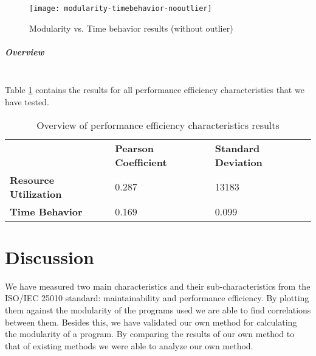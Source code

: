 \documentclass[twoside]{uva-inf-bachelor-thesis}
\newcommand{\myparagraph}[1]{\paragraph{#1}\mbox{}\\}
\begin{document}
\begin{figure}[H]
    \label{figure:perf-time-no}
    \caption{Modularity vs. Time behavior results (without outlier)}
    \centering
        \texttt{[image: modularity-timebehavior-nooutlier]}
\end{figure}

\myparagraph{Overview}
Table \ref{table:perf-overview} contains the results for all performance efficiency characteristics that we have tested. 

\begin{table}[H]
\centering
\caption{Overview of performance efficiency characteristics results}
\label{table:perf-overview}
\begin{tabular}{lll}
                              & \textbf{Pearson Coefficient} & \textbf{Standard Deviation} \\
\textbf{Resource Utilization} & 0.287                        & 13183                       \\
\textbf{Time Behavior}        & 0.169                        & 0.099                      
\end{tabular}
\end{table}

\chapter{Discussion}
We have measured two main characteristics and their sub-characteristics from the ISO/IEC 25010 standard: maintainability and performance efficiency. By plotting them against the modularity of the programs used we are able to find correlations between them. Besides this, we have validated our own method for calculating the modularity of a program. By comparing the results of our own method to that of existing methods we were able to analyze our own method.
\end{document}
